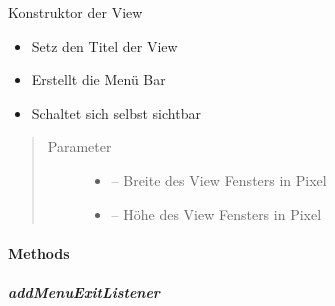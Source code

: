 \documentclass[letterpaper,10pt,ngerman]{sphinxmanual}
\begin{document}
\begin{fulllineitems}
\label{\detokenize{com/linuxluigi/edu/view/View:com.linuxluigi.edu.view.View.View(int, int)}}
Konstruktor der View
\begin{itemize}
\item {} 
Setz den Titel der View

\item {} 
Erstellt die Menü Bar

\item {} 
Schaltet sich selbst sichtbar

\end{itemize}
\begin{quote}\begin{description}
\item[{Parameter}] \leavevmode\begin{itemize}
\item {} 
 -- Breite des View Fensters in Pixel

\item {} 
 -- Höhe des View Fensters in Pixel

\end{itemize}

\end{description}\end{quote}

\end{fulllineitems}



\paragraph{Methods}
\label{\detokenize{com/linuxluigi/edu/view/View:methods}}

\subparagraph{addMenuExitListener}
\label{\detokenize{com/linuxluigi/edu/view/View:addmenuexitlistener}}

\begin{fulllineitems}
\label{\detokenize{com/linuxluigi/edu/view/View:com.linuxluigi.edu.view.View.addMenuExitListener(ActionListener)}}
\end{fulllineitems}
\end{document}
